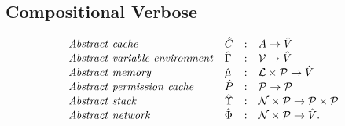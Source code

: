 \newcommand{\all}[0]{\alpha}

\newcommand{\cenvs}{\absC}
\newcommand{\Cat}[0]{\absC_{\hat{C}}}
\newcommand{\muat}[0]{\absC_{\hat{\mu}}}
\newcommand{\Env}[0]{\absC_{\hat{\Gamma}}}
\newcommand{\Pat}[0]{\absC_{\hat{P}}}
\newcommand{\Phiat}[0]{\absC_{\hat{\Phi}}}
\newcommand{\Upsat}[0]{\absC_{\hat{\Upsilon}}}
\newcommand{\ccest}[1]{\cenvs \models_{c \rho_s} #1}
\newcommand{\ccestl}[1]{\cenvs \models_{c \rho_s} {(#1)}^{\alpha}}
\newcommand{\lbt}[1]{{e_#1}^{\alpha_#1}}

\subsection{Compositional Verbose}

\[
\begin{array}{llcl}
\mathit{Abstract\ cache} & \hat{C} & : & A \rightarrow \hat{V} \\
\mathit{Abstract\ variable\ environment} & \hat{\Gamma} & : & \mathcal{V} \rightarrow \hat{V} \\
\mathit{Abstract\ memory} & \hat{\mu} & : & {\mathcal L} \times \mathcal{P} \rightarrow \hat{V} \\
\mathit{Abstract\ permission\ cache} & \hat{P} & : & \mathcal{P} \rightarrow \mathcal{P} \\
\mathit{Abstract\ stack} & \hat{\Upsilon} & : & \mathcal{N} \times \mathcal{P} \rightarrow \mathcal{P} \times \mathcal{P} \\
\mathit{Abstract\ network} & \hat{\Phi} & : & \mathcal{N} \times \mathcal{P} \rightarrow \hat{V}.
\end{array}
\]

